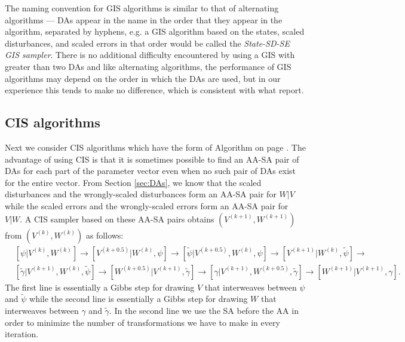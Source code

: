 \documentclass[12pt]{article}
\begin{document}
The naming convention for GIS algorithms is similar to that of alternating algorithms --- DAs appear in the name in the order that they appear in the algorithm, separated by hyphens, e.g. a GIS algorithm based on the states, scaled disturbances, and scaled errors in that order would be called the {\it State-SD-SE GIS sampler}. There is no additional difficulty encountered by using a GIS with greater than two DAs and like alternating algorithms, the performance of GIS algorithms may depend on the order in which the DAs are used, but in our experience this tends to make no difference, which is consistent with what \citet{yu2011center} report.

\subsection{CIS algorithms}\label{sec:Algs:CIS}
Next we consider CIS algorithms which have the form of Algorithm  on page \pageref{alg:CIS}. The advantage of using CIS is that it is sometimes possible to find an AA-SA pair of DAs for each part of the parameter vector even when no such pair of DAs exist for the entire vector. From Section \ref{sec:DAs}, we know that the scaled disturbances and the wrongly-scaled disturbances form an AA-SA pair for $W|V$ while the scaled errors and the wrongly-scaled errors form an AA-SA pair for $V|W$.  A CIS sampler based on these AA-SA pairs obtains $(V^{(k+1)},W^{(k+1)})$ from $(V^{(k)},W^{(k)})$ as follows:
\begin{align*}
&[\psi|V^{(k)},W^{(k)}] \to [V^{(k+0.5)}|W^{(k)},\psi] \to [\tilde{\psi}|V^{(k+0.5)},W^{(k)},\psi] \to [V^{(k+1)}|W^{(k)},\tilde{\psi}]\to\\
&[\tilde{\gamma}|V^{(k+1)},W^{(k)},\tilde{\psi}] \to [W^{(k+0.5)}|V^{(k+1)},\tilde{\gamma}] \to [\gamma|V^{(k+1)},W^{(k+0.5)},\tilde{\gamma}]\to [W^{(k+1)}|V^{(k+1)},\gamma].
\end{align*}
The first line is essentially a Gibbs step for drawing $V$ that interweaves between $\psi$ and $\tilde{\psi}$ while the second line is essentially a Gibbs step for drawing $W$ that interweaves between $\gamma$ and $\tilde{\gamma}$. In the second line we use the SA before the AA in order to minimize the number of transformations we have to make in every iteration. 
\end{document}
